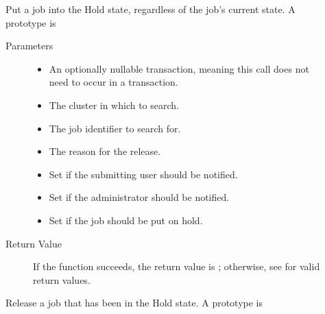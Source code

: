 \begin{description}
\item []
  Put a job into the Hold state, regardless of the job's current state.
  A prototype is 


  \begin{description}
    \item[ Parameters]
    \begin{itemize}
      \item {} 
      An optionally nullable transaction, meaning this call does not 
      need to occur in a transaction. 
      \item {} The cluster in which to search.
      \item {} The job identifier to search for.
      \item {} The reason for the release.
      \item {}
      Set if the submitting user should be notified.
      \item {}
      Set if the administrator should be notified.
      \item {}
      Set if the job should be put on hold.
    \end{itemize}
    \item[ Return Value]
      If the function succeeds, the return value is ; 
      otherwise, see  for valid return values.
  \end{description}   


\item []
  Release a job that has been in the Hold state.
  A prototype is 



\end{description}
